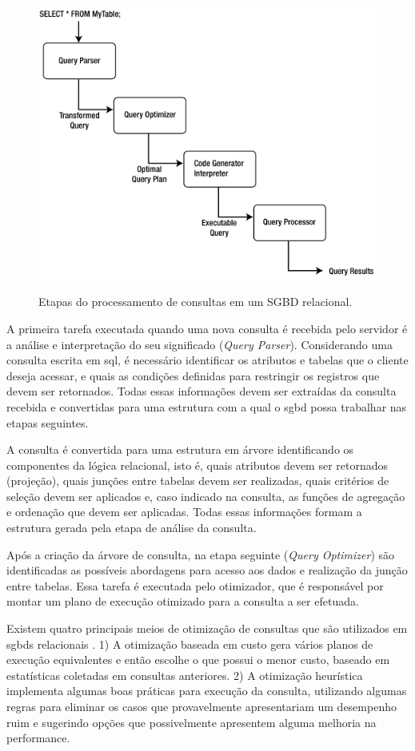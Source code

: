 \begin{figure}[ht]
  \centering
  \caption{Etapas do processamento de consultas em um SGBD relacional.}
  \includegraphics[width=.8\textwidth]{images/etapas-execucao-consulta.png}
  \label{fig:etapas-execucao-consulta}
\end{figure}

A primeira tarefa executada quando uma nova consulta é recebida pelo servidor é a análise e interpretação do seu significado (\emph{Query Parser}). Considerando uma consulta escrita em \gls{sql}, é necessário identificar os atributos e tabelas que o cliente deseja acessar, e quais as condições definidas para restringir os registros que devem ser retornados. Todas essas informações devem ser extraídas da consulta recebida e convertidas para uma estrutura com a qual o \gls{sgbd} possa trabalhar nas etapas seguintes.

A consulta é convertida para uma estrutura em árvore identificando os componentes da lógica relacional, isto é, quais atributos devem ser retornados (projeção), quais junções entre tabelas devem ser realizadas, quais critérios de seleção devem ser aplicados e, caso indicado na consulta, as funções de agregação e ordenação que devem ser aplicadas. Todas essas informações formam a estrutura gerada pela etapa de análise da consulta.

Após a criação da árvore de consulta, na etapa seguinte (\emph{Query Optimizer}) são identificadas as possíveis abordagens para acesso aos dados e realização da junção entre tabelas. Essa tarefa é executada pelo otimizador, que é responsável por montar um plano de execução otimizado para a consulta a ser efetuada.

Existem quatro principais meios de otimização de consultas que são utilizados em \glspl{sgbd} relacionais \cite{Bell:2012}. 1) A otimização baseada em custo gera vários planos de execução equivalentes e então escolhe o que possui o menor custo, baseado em estatísticas coletadas em consultas anteriores. 2) A otimização heurística implementa algumas boas práticas para execução da consulta, utilizando algumas regras para eliminar os casos que provavelmente apresentariam um desempenho ruim e sugerindo opções que possivelmente apresentem alguma melhoria na performance.

